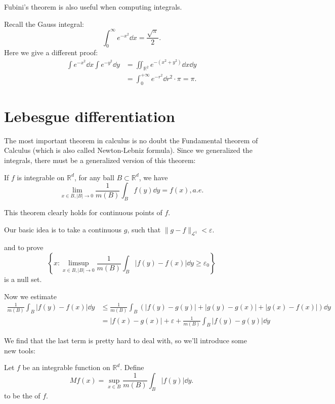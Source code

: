 Fubini's theorem is also useful when computing integrals.
\begin{example}
	Recall the Gauss integral:
	\[
	\int_0^\infty e^{-x^2}\dd x = \frac{\sqrt{\pi}}{2}.
	\]
	Here we give a different proof:
	\begin{align*}
		\int e^{-x^2}\dd x \int e^{-y^2}\dd y
		&= \iint_{\mathbb{R}^2} e^{-(x^2+y^2)}\dd x\dd y\\
		&= \int_{0}^{+\infty} e^{-r^2} \dd r^2 \cdot \pi = \pi.
	\end{align*}
\end{example}

\section{Lebesgue differentiation}
\label{sec:Lebesgue differentiation}

The most important theorem in calculus is no doubt the
Fundamental theorem of Calculus (which is also called Newton-Lebniz formula).
Since we generalized the integrals,
there must be a generalized version of this theorem:
\begin{theorem}
	\label{Lebesgue differentiation thm p1}
	If $f$ is integrable on $\mathbb{R}^d$,
	for any ball $B \subset \mathbb{R}^d$, we have
	\[
	\lim_{x\in B, |B|\to 0}\frac{1}{m(B)} \int_B f(y)\dd y = f(x), a.e.
	\]
\end{theorem}
This theorem clearly holds for continuous points of $f$.

Our basic idea is to take a continuous  $g$, such that
$\lVert g-f \rVert_{\mathcal{L}^1} <\varepsilon$.

and to prove
\[
\left\{x:
\limsup_{x\in B, |B|\to 0} \frac{1}{m(B)}\int_B|f(y)-f(x)|\dd y \ge \varepsilon_0
\right\}
\]
is a null set.

Now we estimate
\begin{align*}
    \frac{1}{m(B)}\int_B |f(y)-f(x)|\dd y
	&\le \frac{1}{m(B)}\int _B \left( |f(y)-g(y)|+|g(y)-g(x)|+|g(x)-f(x)| \right)\dd y
	\\
	&= |f(x)-g(x)| + \varepsilon + \frac{1}{m(B)}\int_B |f(y)-g(y)|\dd y
\end{align*}

We find that the last term is pretty hard to deal with,
so we'll introduce some new tools:
\begin{definition}
	Let $f$ be an integrable function on  $\mathbb{R}^d$. Define
	\[
	Mf(x) = \sup_{x\in B}\frac{1}{m(B)}\int_B |f(y)|\dd y.
	\]
	to be the  of $f$.
\end{definition}

